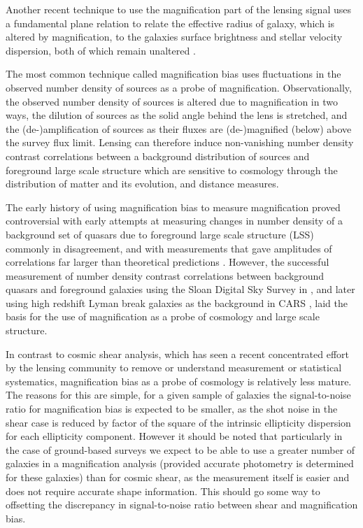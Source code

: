 \documentclass[useAMS,usenatbib,times,letter,amssymb]{mn2e}
\begin{document}
Another recent technique to use the magnification part of the lensing signal uses a fundamental plane relation to relate the effective radius of galaxy, which is altered by magnification, to the galaxies surface brightness and stellar velocity dispersion, both of which remain unaltered \citep{Huff:2011p1392}.

The most common technique called magnification bias uses fluctuations in the observed number density of sources as a probe of magnification. Observationally, the observed number density of sources is altered due to magnification in two ways, the dilution of sources as the solid angle behind the lens is stretched, and the (de-)amplification of sources as their fluxes are (de-)magnified (below) above the survey flux limit. Lensing can therefore induce non-vanishing number density contrast correlations between a background distribution of sources and foreground large scale structure which are sensitive to cosmology through the distribution of matter and its evolution, and distance measures.

The early history of using magnification bias to measure magnification proved controversial with early attempts at measuring changes in number density of a background set of quasars due to foreground large scale structure (LSS) commonly in disagreement, and with measurements that gave amplitudes of correlations far larger than theoretical predictions \cite[][ provides a concise summary of early literature]{Scranton:2005p1124}. However, the successful measurement of number density contrast correlations between background quasars and foreground galaxies using the Sloan Digital Sky Survey in \cite{Scranton:2005p1124}, and later using high redshift Lyman break galaxies as the background in CARS \citep{Hildebrandt:2009p845}, laid the basis for the use of magnification as a probe of cosmology and large scale structure.

In contrast to cosmic shear analysis, which has seen a recent concentrated effort by the lensing community to remove or understand measurement or statistical systematics, magnification bias as a probe of cosmology is relatively less mature. The reasons for this are simple, for a given sample of galaxies the signal-to-noise ratio for magnification bias is expected to be smaller, as the shot noise in the shear case is reduced by factor of the square of the intrinsic ellipticity dispersion for each ellipticity component. However it should be noted that particularly in the case of ground-based surveys we expect to be able to use a greater number of galaxies in a magnification analysis (provided accurate photometry is determined for these galaxies) than for cosmic shear, as the measurement itself is easier and does not require accurate shape information. This should go some way to offsetting the discrepancy in signal-to-noise ratio between shear and magnification bias. 
\end{document}
